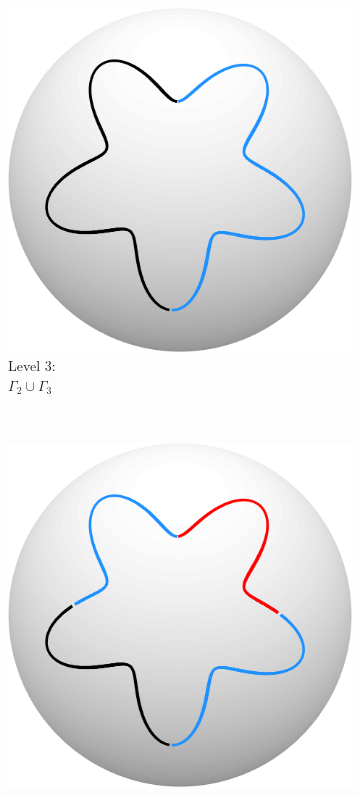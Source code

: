 \documentclass{sfuthesis}
\begin{document}
\begin{figure}
\begin{subfigure}[b]{0.23\textwidth}
                \includegraphics[width=\textwidth]{ContourLevel3}
                \caption{Level 3: \\$\Gamma_2 \cup \Gamma_3$}
                \label{fig: ContourLevel3}
        \end{subfigure}
        ~ 
        \begin{subfigure}[b]{0.23\textwidth}
        \captionsetup{justification=centering}
                \includegraphics[width=\textwidth]{ContourLevel2}

\end{subfigure}
\end{figure}
\end{document}
